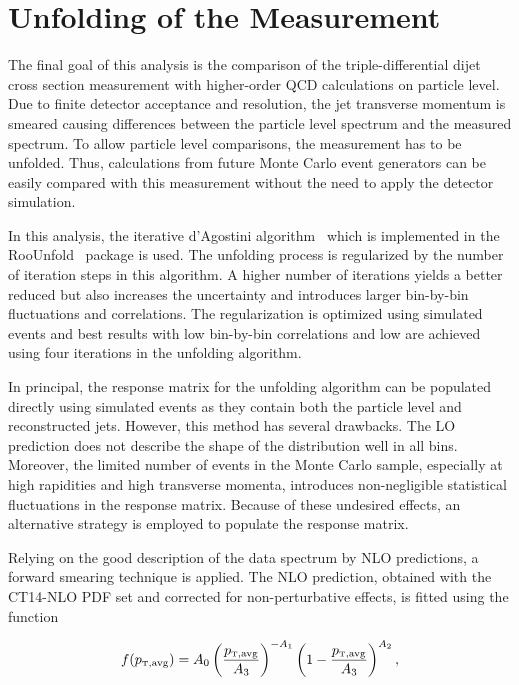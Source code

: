 \section{Unfolding of the Measurement}
\label{sec:unfolding}

The final goal of this analysis is the comparison of the triple-differential
dijet cross section measurement with higher-order QCD calculations on
particle level. Due to finite detector acceptance and resolution, the jet
transverse momentum is smeared causing differences between the particle level
\ptavg spectrum and the measured spectrum. To allow particle level comparisons,
the measurement has to be unfolded. Thus, calculations from future Monte Carlo
event generators can be easily compared with this measurement without the need to
apply the detector simulation.

In this analysis, the iterative d'Agostini algorithm~\cite{DAgostini:1994zf}
which is implemented in the RooUnfold~\cite{Adye:2011gm} package is used. The
unfolding process is regularized by the number of iteration steps in this
algorithm. A higher number of iterations yields a better reduced \chisq but also
increases the uncertainty and introduces larger bin-by-bin fluctuations and
correlations. The regularization is optimized using simulated events and best
results with low bin-by-bin correlations and low \chisq are achieved using
four iterations in the unfolding algorithm.

In principal, the response matrix for the unfolding algorithm can be populated
directly using simulated events as they contain both the particle level and
reconstructed jets. However, this method has several drawbacks. The LO
prediction does not describe the shape of the distribution well in all
bins. Moreover, the limited number of events in the Monte Carlo sample,
especially at high rapidities and high transverse momenta, introduces
non-negligible statistical fluctuations in the response matrix. Because of these
undesired effects, an alternative strategy is employed to populate the response
matrix.

Relying on the good description of the data spectrum by NLO predictions, a forward
smearing technique is applied. The NLO prediction, obtained with the CT14-NLO PDF
set and corrected for non-perturbative effects, is fitted using the function

\begin{equation}
    f(\ptavg) = A_0 \left(
    \frac{\ptavg}{A_3}\right)^{-A_1}\left(1-\frac{\ptavg}{A_3}\right)^{A_2},
\end{equation}

